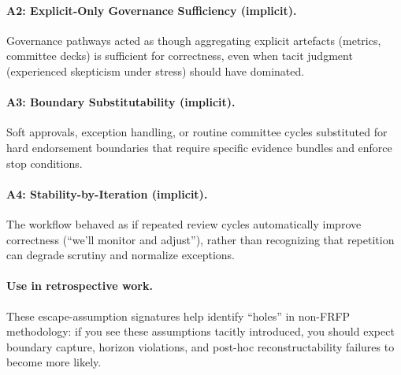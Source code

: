 \paragraph{A2: Explicit-Only Governance Sufficiency (implicit).}
Governance pathways acted as though aggregating explicit artefacts (metrics, committee decks) is sufficient for correctness, even when tacit judgment (experienced skepticism under stress) should have dominated.

\paragraph{A3: Boundary Substitutability (implicit).}
Soft approvals, exception handling, or routine committee cycles substituted for hard endorsement boundaries that require specific evidence bundles and enforce stop conditions.

\paragraph{A4: Stability-by-Iteration (implicit).}
The workflow behaved as if repeated review cycles automatically improve correctness (``we’ll monitor and adjust''), rather than recognizing that repetition can degrade scrutiny and normalize exceptions.

\paragraph{Use in retrospective work.}
These escape-assumption signatures help identify “holes” in non-FRFP methodology: if you see these assumptions tacitly introduced, you should expect boundary capture, horizon violations, and post-hoc reconstructability failures to become more likely.

